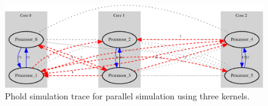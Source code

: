 \begin{figure}
    \center
    \includegraphics[width=\plotfraction\columnwidth]{fig/phold_parallel_allocation.eps}
    \caption{Phold simulation trace for parallel simulation using three kernels.}
    \label{fig:phold_allocation}
\end{figure}
